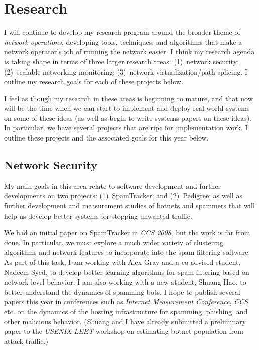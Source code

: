 \begin{sloppypar}
\section*{Research}

I will continue to develop my research program around the broader theme
of {\em network operations}, developing tools, techniques, and
algorithms that make a network operator's job of running the network
easier.  I think my research agenda is taking shape in terms of three
larger research areas: (1)~network security; (2)~scalable networking
monitoring; (3)~network virtualization/path splicing.  I outline my
research goals for each of these projects below.

I feel as though my research in these areas is beginning to mature, and
that now will be the time when we can start to implement and deploy
real-world systems on some of these ideas (as well as begin to write
systems papers on these ideas).  In particular, we have several projects
that are ripe for implementation work.  I outline these projects and the
associated goals for this year below.  

\subsection*{Network Security}

My main goals in this area relate to software development and further
developments on two projects: (1)~SpamTracker; and (2)~Pedigree; as well
as further development and measurement studies of botnets and spammers
that will help us develop better systems for stopping unwanted traffic.

We had an initial paper on SpamTracker in {\em CCS 2008}, but the work
is far from done.  In particular, we must explore a much wider variety
of clusteirng algorithms and network features to incorporate into the
spam filtering software.  As part of this task, I am working with Alex
Gray and a co-advised student, Nadeem Syed, to develop better learning
algorithms for spam filtering based on network-level behavior.  I am
also working with a new student, Shuang Hao, to better understand the
dynamics of spamming bots.  I hope to publish several papers this year
in conferences such as {\em Internet Measurement Conference}, {\em CCS},
etc. on the dynamics of the hosting infrastructure for spamming,
phishing, and other malicious behavior.  (Shuang and I have already
submitted a preliminary paper to the {\em USENIX LEET} workshop on
estimating botnet population from attack traffic.)


\end{sloppypar}
